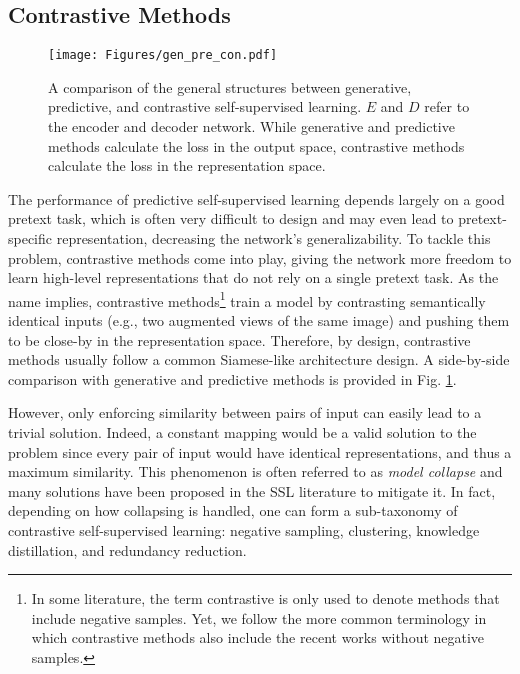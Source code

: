 \documentclass[lettersize,journal]{IEEEtran}
\begin{document}
\subsection{Contrastive Methods}
\label{sec:ContrastiveMethods}

\begin{figure}
\centering
\texttt{[image: Figures/gen\_pre\_con.pdf]}
\caption[GPC]{A comparison of the general structures between generative, predictive, and contrastive self-supervised learning. $E$ and $D$ refer to the encoder and decoder network. While generative and predictive methods calculate the loss in the output space, contrastive methods calculate the loss in the representation space.}
\label{fig:GPC}
\end{figure}

The performance of predictive self-supervised learning depends largely on a good pretext task, which is often very difficult to design and may even lead to pretext-specific representation, decreasing the network's generalizability. To tackle this problem, contrastive methods come into play, giving the network more freedom to learn high-level representations that do not rely on a single pretext task. As the name implies, contrastive methods\footnote{In some literature, the term contrastive is only used to denote methods that include negative samples. Yet, we follow the more common terminology in which contrastive methods also include the recent works without negative samples.} train a model by contrasting semantically identical inputs (e.g., two augmented views of the same image) and pushing them to be close-by in the representation space. Therefore, by design, contrastive methods usually follow a common Siamese-like architecture design. A side-by-side comparison with generative and predictive methods is provided in Fig. \ref{fig:GPC}.

However, only enforcing similarity between pairs of input can easily lead to a trivial solution. Indeed, a constant mapping would be a valid solution to the problem since every pair of input would have identical representations, and thus a maximum similarity. This phenomenon is often referred to as \textit{model collapse} and many solutions have been proposed in the SSL literature to mitigate it. In fact, depending on how collapsing is handled, one can form a sub-taxonomy of contrastive self-supervised learning: negative sampling, clustering, knowledge distillation, and redundancy reduction.
\end{document}
